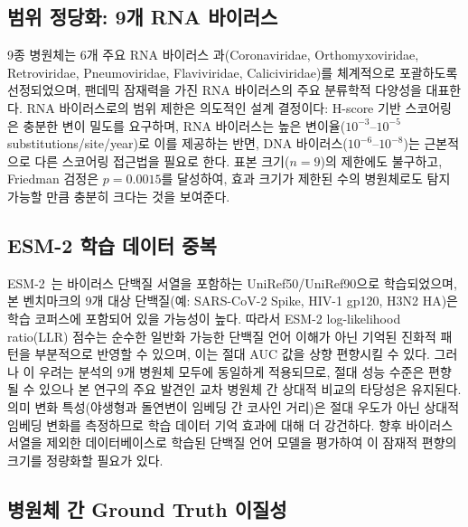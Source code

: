 \subsection{범위 정당화: 9개 RNA 바이러스}

9종 병원체는 6개 주요 RNA 바이러스 과(Coronaviridae, Orthomyxoviridae, Retroviridae, Pneumoviridae, Flaviviridae, Caliciviridae)를 체계적으로 포괄하도록 선정되었으며, 팬데믹 잠재력을 가진 RNA 바이러스의 주요 분류학적 다양성을 대표한다.
RNA 바이러스로의 범위 제한은 의도적인 설계 결정이다: H-score 기반 스코어링은 충분한 변이 밀도를 요구하며, RNA 바이러스는 높은 변이율($10^{-3}$--$10^{-5}$ substitutions/site/year)로 이를 제공하는 반면, DNA 바이러스($10^{-6}$--$10^{-8}$)는 근본적으로 다른 스코어링 접근법을 필요로 한다.
표본 크기($n=9$)의 제한에도 불구하고, Friedman 검정은 $p=0.0015$를 달성하여, 효과 크기가 제한된 수의 병원체로도 탐지 가능할 만큼 충분히 크다는 것을 보여준다.

\subsection{ESM-2 학습 데이터 중복}
\label{sec:esm2_leakage}

ESM-2~\cite{lin2023esm2}는 바이러스 단백질 서열을 포함하는 UniRef50/UniRef90으로 학습되었으며, 본 벤치마크의 9개 대상 단백질(예: SARS-CoV-2 Spike, HIV-1 gp120, H3N2 HA)은 학습 코퍼스에 포함되어 있을 가능성이 높다.
따라서 ESM-2 log-likelihood ratio(LLR) 점수는 순수한 일반화 가능한 단백질 언어 이해가 아닌 기억된 진화적 패턴을 부분적으로 반영할 수 있으며, 이는 절대 AUC 값을 상향 편향시킬 수 있다.
그러나 이 우려는 분석의 9개 병원체 모두에 동일하게 적용되므로, 절대 성능 수준은 편향될 수 있으나 본 연구의 주요 발견인 교차 병원체 간 상대적 비교의 타당성은 유지된다.
의미 변화 특성(야생형과 돌연변이 임베딩 간 코사인 거리)은 절대 우도가 아닌 상대적 임베딩 변화를 측정하므로 학습 데이터 기억 효과에 대해 더 강건하다.
향후 바이러스 서열을 제외한 데이터베이스로 학습된 단백질 언어 모델을 평가하여 이 잠재적 편향의 크기를 정량화할 필요가 있다.

\subsection{병원체 간 Ground Truth 이질성}
\label{sec:gt_heterogeneity}

